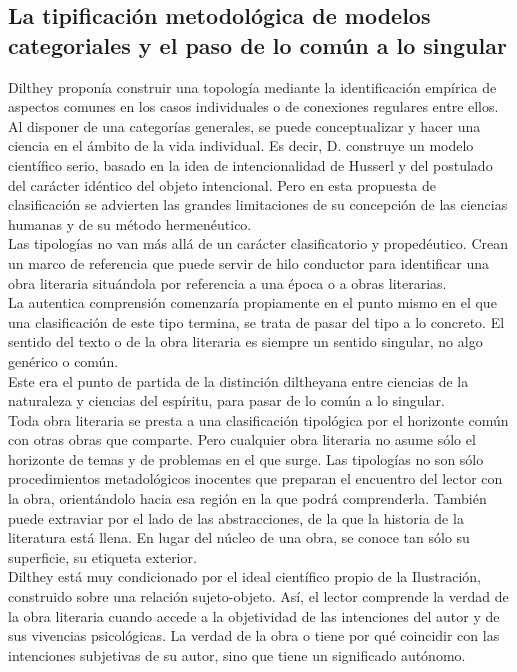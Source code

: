 \documentclass[a4paper, 11pt, twocolumn, spanish]{article}
\begin{document}
\subsection{La tipificación metodológica de modelos categoriales y el paso de lo común a lo singular}
\label{sec:orge52f102}

Dilthey proponía construir una topología mediante la identificación
empírica de aspectos comunes en los casos individuales o de conexiones
regulares entre ellos. Al disponer de una categorías generales, se
puede conceptualizar y hacer una ciencia en el ámbito de la vida
individual.  Es decir, D. construye un modelo científico serio, basado
en la idea de intencionalidad de Husserl y del postulado del carácter
idéntico del objeto intencional. Pero en esta propuesta de
clasificación se advierten las grandes limitaciones de su concepción
de las ciencias humanas y de su método hermenéutico.\\[0pt]

Las tipologías no van más allá de un carácter clasificatorio y
propedéutico. Crean un marco de referencia que puede servir de hilo
conductor para identificar una obra literaria situándola por
referencia a una época o a obras literarias.\\[0pt]
La autentica comprensión comenzaría propiamente en el punto mismo en
el que una clasificación de este tipo termina, se trata de pasar del
tipo a lo concreto. El sentido del texto o de la obra literaria es
siempre un sentido singular, no algo genérico o común.\\[0pt]
Este era el punto de partida de la distinción diltheyana entre
ciencias de la naturaleza y ciencias del espíritu, para pasar de lo
común a lo singular.\\[0pt]

Toda obra literaria se presta a una clasificación tipológica por el
horizonte común con otras obras que comparte. Pero cualquier obra
literaria no asume sólo el horizonte de temas y de problemas en el que
surge. Las tipologías no son sólo procedimientos metadológicos
inocentes que preparan el encuentro del lector con la obra,
orientándolo hacia esa región en la que podrá comprenderla. También
puede extraviar por el lado de las abstracciones, de la que la historia
de la literatura está llena. En lugar del núcleo de una obra, se
conoce tan sólo su superficie, su etiqueta exterior.\\[0pt]

Dilthey está muy condicionado por el ideal científico propio de la
Ilustración, construido sobre una relación sujeto-objeto. Así, el lector
comprende la verdad de la obra literaria cuando accede a la
objetividad de las intenciones del autor y de sus vivencias
psicológicas. La verdad de la obra o tiene por qué coincidir con las
intenciones subjetivas de su autor, sino que tiene un significado
autónomo.\\[0pt]
\end{document}
